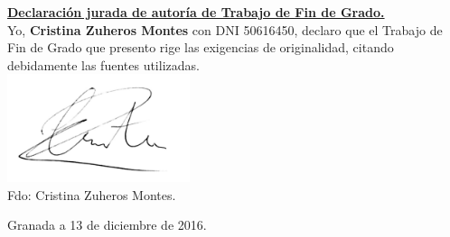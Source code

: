 \documentclass[14pt]{extarticle}
\begin{document}
\newpage
\underline{\textbf{Declaración jurada de autoría de Trabajo de Fin de Grado.}}\\

Yo, \textbf{Cristina Zuheros Montes} con DNI 50616450, declaro que el Trabajo de Fin de Grado que presento rige las exigencias de originalidad, citando debidamente las fuentes utilizadas.\\[1cm]

\includegraphics[width=0.4\textwidth]{mifirma.jpg}\\
\hspace{5cm}Fdo: Cristina Zuheros Montes.\\

\begin{flushright}
	Granada a 13 de diciembre de 2016.
\end{flushright}
\end{document}
